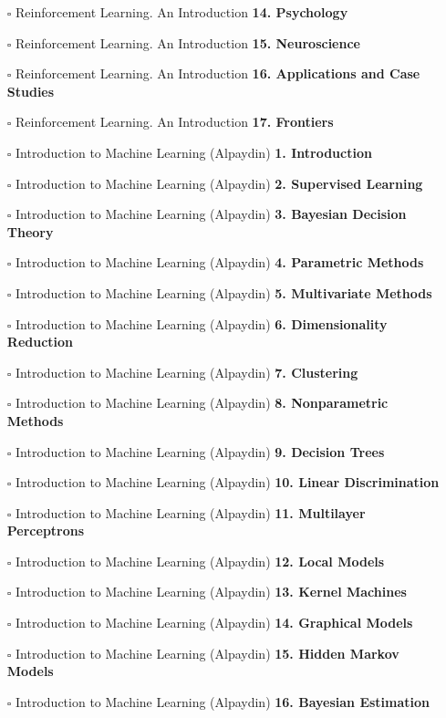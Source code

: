 \documentclass[a4, landscape, 12pt]{article}
\newcommand{\checkbox}{$\square$}%
\begin{document}
\begin{itemize}
{}
\item [\checkbox]  Reinforcement Learning. An Introduction \textbf{ 14. Psychology
}
\item [\checkbox]  Reinforcement Learning. An Introduction \textbf{ 15. Neuroscience
}
\item [\checkbox]  Reinforcement Learning. An Introduction \textbf{ 16. Applications and Case Studies
}
\item [\checkbox]  Reinforcement Learning. An Introduction \textbf{ 17. Frontiers
}
\item [\checkbox]  Introduction to Machine Learning (Alpaydin) \textbf{ 1. Introduction
}
\item [\checkbox]  Introduction to Machine Learning (Alpaydin) \textbf{ 2. Supervised Learning
}
\item [\checkbox]  Introduction to Machine Learning (Alpaydin) \textbf{ 3. Bayesian Decision Theory
}
\item [\checkbox]  Introduction to Machine Learning (Alpaydin) \textbf{ 4. Parametric Methods
}
\item [\checkbox]  Introduction to Machine Learning (Alpaydin) \textbf{ 5. Multivariate Methods
}
\item [\checkbox]  Introduction to Machine Learning (Alpaydin) \textbf{ 6. Dimensionality Reduction
}
\item [\checkbox]  Introduction to Machine Learning (Alpaydin) \textbf{ 7. Clustering
}
\item [\checkbox]  Introduction to Machine Learning (Alpaydin) \textbf{ 8. Nonparametric Methods
}
\item [\checkbox]  Introduction to Machine Learning (Alpaydin) \textbf{ 9. Decision Trees
}
\item [\checkbox]  Introduction to Machine Learning (Alpaydin) \textbf{ 10. Linear Discrimination
}
\item [\checkbox]  Introduction to Machine Learning (Alpaydin) \textbf{ 11. Multilayer Perceptrons
}
\item [\checkbox]  Introduction to Machine Learning (Alpaydin) \textbf{ 12. Local Models
}
\item [\checkbox]  Introduction to Machine Learning (Alpaydin) \textbf{ 13. Kernel Machines
}
\item [\checkbox]  Introduction to Machine Learning (Alpaydin) \textbf{ 14. Graphical Models
}
\item [\checkbox]  Introduction to Machine Learning (Alpaydin) \textbf{ 15. Hidden Markov Models
}
\item [\checkbox]  Introduction to Machine Learning (Alpaydin) \textbf{ 16. Bayesian Estimation
}
\end{itemize}
\end{document}
